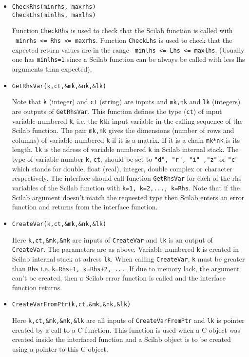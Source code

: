 \begin{itemize}
\item{
\begin{verbatim}
CheckRhs(minrhs, maxrhs)
CheckLhs(minlhs, maxlhs)
\end{verbatim}
Function \verb!CheckRhs! is used to check that the Scilab function is called
with \\
{\verb! minrhs <= Rhs <= maxrhs!}. 
Function \verb!CheckLhs! is used to check that the expected return
values are in the range 
{\verb! minlhs <= Lhs <= maxlhs!}. (Usually one has {\tt minlhs=1}
since a Scilab function can be always be called with less lhs
arguments than expected).
}
\item{
\begin{verbatim}
GetRhsVar(k,ct,&mk,&nk,&lk)
\end{verbatim}
Note that \verb!k! (integer) and \verb!ct! (string) are inputs and 
\verb!mk,nk! and \verb!lk! (integers) are outputs of \verb!GetRhsVar!.
This function defines the type (\verb!ct!) of input variable numbered
\verb!k!, i.e. the \verb!k!th input variable in the calling sequence of the 
Scilab function. The pair \verb!mk,nk! gives the dimensions (number of rows
and columns)  of variable numbered \verb!k! if it is a matrix. 
If it is a chain \verb!mk*nk! is its length. \verb!lk! is the adress
of variable numbered \verb!k! in Scilab internal stack.
The type of variable number \verb!k!, \verb!ct!, should be set 
to {\tt "d", "r", "i" ,"z"} or {\tt "c"} which stands for double, float
(real), integer, double complex 
or character respectively. The interface should call function
\verb!GetRhsVar! for each of the rhs variables of the Scilab function
with {\tt k=1, k=2,..., k=Rhs}.
Note that if the Scilab argument doesn't match the requested type then 
Scilab enters an error function and returns from the interface function.
}
\item{
\begin{verbatim}
CreateVar(k,ct,&mk,&nk,&lk)
\end{verbatim}
Here \verb!k,ct,&mk,&nk! are inputs of \verb!CreateVar! and \verb!lk! is an
output of \verb!CreateVar!. The parameters are as above. Variable numbered
\verb!k! is created in Scilab internal stack at adress {\tt lk}. When
calling {\tt CreateVar}, {\tt k} must be greater than {\tt Rhs} i.e.
{\tt k=Rhs+1, k=Rhs+2, ...}.
If due to memory lack, the argument can't be created, then a Scilab error 
function is called and the interface function returns.
}
\item{
\begin{verbatim}
CreateVarFromPtr(k,ct,&mk,&nk,&lk)
\end{verbatim}
Here \verb!k,ct,&mk,&nk,&lk! are all inputs of \verb!CreateVarFromPtr! and
\verb!lk! is pointer created by a call to a C function. This function is used 
when a C object was created inside the interfaced function and a Scilab 
object is to be created using a pointer to this C object. }
\end{itemize}


